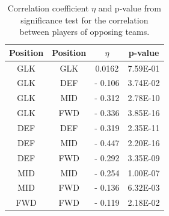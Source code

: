 \begin{table}[!htb]
\centering
\begin{tabular}{|c|c|c|c|}
\hline
Position & Position & $\eta$ & p-value  \\
\hline
GLK   \Tstrut    & GLK      & 0.0162  & 7.59E-01  \\
GLK      & DEF      & - 0.106 & 3.74E-02  \\
GLK      & MID      & - 0.312 & 2.78E-10 \\
GLK      & FWD      & - 0.336 & 3.85E-16 \\
DEF      & DEF      & - 0.319 & 2.35E-11 \\
DEF      & MID      & - 0.447 & 2.20E-16 \\
DEF      & FWD      & - 0.292 & 3.35E-09 \\
MID      & MID      & - 0.254 & 1.00E-07 \\
MID      & FWD      & - 0.136 & 6.32E-03  \\
FWD    \Bstrut   & FWD      & - 0.119 & 2.18E-02 \\
\hline
\end{tabular}
\caption{Correlation coefficient $\eta$ and p-value from significance test for the correlation between players of opposing teams.}
\label{tab:cor_opp}
\end{table}